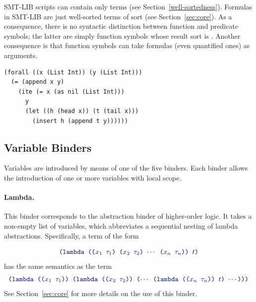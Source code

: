 SMT-LIB scripts can contain only  terms
(see Section~\ref{well-sortedness}).
Formulas in SMT-LIB are just well-sorted terms of sort 
 (see Section~\ref{sec:core}).
As a consequence, there is no syntactic distinction 
between function and predicate symbols;
the latter are simply function symbols whose result sort is .
Another consequence is that function symbols can take formulas 
(even quantified ones) as arguments.

\begin{lstlisting}[linewidth=29em]
(forall ((x (List Int)) (y (List Int)))
  (= (append x y)
    (ite (= x (as nil (List Int)))
      y
      (let ((h (head x)) (t (tail x)))
        (insert h (append t y))))))
\end{lstlisting}


\subsection{Variable Binders}  \label{sec:binders}

Variables are introduced by means of one of the five binders.
Each binder allows the introduction of one or more variables with local scope.

\paragraph{Lambda.}


This binder corresponds to the abstraction binder of higher-order logic.
It takes a non-empty list of variables, 
which abbreviates a sequential nesting of lambda abstractions.
Specifically, a term of the form

\begin{equation} \label{eq:lambda}
  \expr{
  (lambda (($x_1$ $\tau_1$) ($x_2$ $\tau_2$) $\cdots$ ($x_n$ $\tau_n$)) 
    $t$)
  }
\end{equation}
has the same semantics as the term
%
  \begin{equation} \label{eq:nested-lambda}
  \expr{
   (lambda (($x_1$ $\tau_1$)) 
   (lambda (($x_2$ $\tau_2$)) ($\cdots$ 
   (lambda (($x_n$ $\tau_n$)) $t$) $\cdots$)))
  }
  \end{equation}
  See Section~\ref{sec:core} for more details on the use of this binder.

